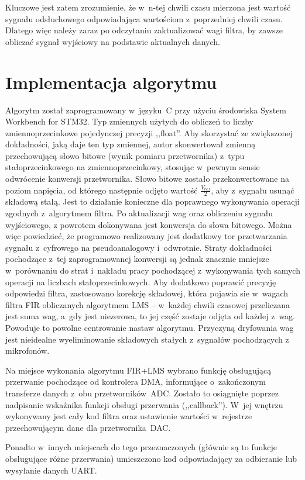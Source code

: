 Kluczowe jest zatem zrozumienie, że w~n-tej chwili czasu mierzona jest wartość sygnału odsłuchowego odpowiadająca wartościom z~poprzedniej chwili czasu. Dlatego więc należy zaraz po odczytaniu zaktualizować wagi filtra, by zawsze obliczać sygnał wyjściowy na podstawie aktualnych danych.
\section{Implementacja algorytmu}
Algorytm został zaprogramowany w~języku~C przy użyciu środowiska System Workbench for STM32. Typ zmiennych użytych do obliczeń to liczby zmiennoprzecinkowe pojedynczej precyzji ,,float''. Aby skorzystać ze zwiększonej dokładności, jaką daje ten typ zmiennej, autor skonwertował zmienną przechowującą słowo bitowe (wynik pomiaru przetwornika) z~typu stałoprzecinkowego na zmiennoprzecinkowy, stosując w~pewnym sensie odwrócenie konwersji przetwornika. Słowo bitowe zostało przekonwertowane na poziom napięcia, od którego następnie odjęto wartość $ \frac{V_{ref}}{2} $, aby z~sygnału usunąć składową stałą. Jest to działanie konieczne dla poprawnego wykonywania operacji zgodnych z~algorytmem filtra. Po aktualizacji wag oraz obliczeniu sygnału wyjściowego, z powrotem dokonywana jest konwersja do słowa bitowego. Można więc powiedzieć, że programowo realizowany jest dodatkowy tor przetwarzania sygnału z~cyfrowego na pseudoanalogowy i~odwrotnie. Straty dokładności pochodzące z~tej zaprogramowanej konwersji są jednak znacznie mniejsze w~porównaniu do strat i~nakładu pracy pochodzącej z~wykonywania tych samych operacji na liczbach stałoprzecinkowych. Aby dodatkowo poprawić precyzję odpowiedzi filtra, zastosowano korekcję składowej, która pojawia sie w~wagach filtra FIR obliczanych algorytmem LMS -- w~każdej chwili czasowej przeliczana jest suma wag, a~gdy jest niezerowa, to jej część zostaje odjęta od każdej z~wag. Powoduje to powolne centrowanie nastaw algorytmu. Przyczyną dryfowania wag jest nieidealne wyeliminowanie składowych stałych z~sygnałów pochodzących z mikrofonów.

Na miejsce wykonania algorytmu FIR+LMS wybrano funkcję obsługującą przerwanie pochodzące od kontrolera DMA, informujące o~zakończonym transferze danych z~obu przetworników~ADC. Zostało to osiągnięte poprzez nadpisanie wskaźnika funkcji obsługi przerwania (,,callback''). W~jej wnętrzu wykonywany jest cały kod filtra oraz ustawienie wartości w~rejestrze przechowującym dane dla przetwornika~DAC.

Ponadto w~innych miejscach do tego przeznaczonych (głównie są to funkcje obsługujące różne przerwania) umieszczono kod odpowiadający za odbieranie lub wysyłanie danych UART.
